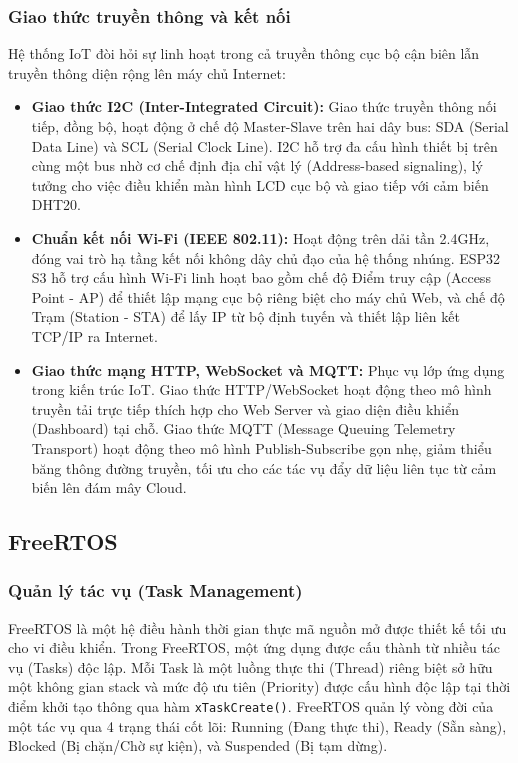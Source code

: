 \subsubsection{Giao thức truyền thông và kết nối}
Hệ thống IoT đòi hỏi sự linh hoạt trong cả truyền thông cục bộ cận biên lẫn truyền thông diện rộng lên máy chủ Internet:
\begin{itemize}
    \item \textbf{Giao thức I2C (Inter-Integrated Circuit):} Giao thức truyền thông nối tiếp, đồng bộ, hoạt động ở chế độ Master-Slave trên hai dây bus: SDA (Serial Data Line) và SCL (Serial Clock Line). I2C hỗ trợ đa cấu hình thiết bị trên cùng một bus nhờ cơ chế định địa chỉ vật lý (Address-based signaling), lý tưởng cho việc điều khiển màn hình LCD cục bộ và giao tiếp với cảm biến DHT20.
    \item \textbf{Chuẩn kết nối Wi-Fi (IEEE 802.11):} Hoạt động trên dải tần 2.4GHz, đóng vai trò hạ tầng kết nối không dây chủ đạo của hệ thống nhúng. ESP32 S3 hỗ trợ cấu hình Wi-Fi linh hoạt bao gồm chế độ Điểm truy cập (Access Point - AP) để thiết lập mạng cục bộ riêng biệt cho máy chủ Web, và chế độ Trạm (Station - STA) để lấy IP từ bộ định tuyến và thiết lập liên kết TCP/IP ra Internet.
    \item \textbf{Giao thức mạng HTTP, WebSocket và MQTT:} Phục vụ lớp ứng dụng trong kiến trúc IoT. Giao thức HTTP/WebSocket hoạt động theo mô hình truyền tải trực tiếp thích hợp cho Web Server và giao diện điều khiển (Dashboard) tại chỗ. Giao thức MQTT (Message Queuing Telemetry Transport) hoạt động theo mô hình Publish-Subscribe gọn nhẹ, giảm thiểu băng thông đường truyền, tối ưu cho các tác vụ đẩy dữ liệu liên tục từ cảm biến lên đám mây Cloud.
\end{itemize}

\subsection{FreeRTOS}

\subsubsection{Quản lý tác vụ (Task Management)}
FreeRTOS là một hệ điều hành thời gian thực mã nguồn mở được thiết kế tối ưu cho vi điều khiển. Trong FreeRTOS, một ứng dụng được cấu thành từ nhiều tác vụ (Tasks) độc lập. Mỗi Task là một luồng thực thi (Thread) riêng biệt sở hữu một không gian stack và mức độ ưu tiên (Priority) được cấu hình độc lập tại thời điểm khởi tạo thông qua hàm \texttt{xTaskCreate()}. FreeRTOS quản lý vòng đời của một tác vụ qua 4 trạng thái cốt lõi: Running (Đang thực thi), Ready (Sẵn sàng), Blocked (Bị chặn/Chờ sự kiện), và Suspended (Bị tạm dừng).

